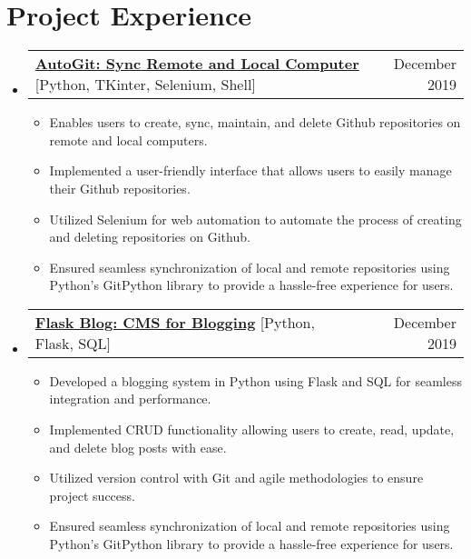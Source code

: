\documentclass[letterpaper,11pt]{article}
\makeatletter
\newcommand{\resumeItem}[1]{
  \item\small{
    {#1 \vspace{-2pt}}
  }
}
\newcommand{\resumeSubheading}[4]{
  \vspace{-2pt}\item
    \begin{tabular*}{0.97\textwidth}[t]{l@{\extracolsep{\fill}}r}
      \textbf{#1} & #2 \\
      \textit{\small#3} & \textit{\small #4} \\
    \end{tabular*}\vspace{-7pt}
}
\newcommand{\resumeProjectHeading}[2]{
    \item
    \begin{tabular*}{0.97\textwidth}{l@{\extracolsep{\fill}}r}
      \small#1 & #2 \\
    \end{tabular*}\vspace{-7pt}
}
\newcommand{\resumeSubHeadingListStart}{\begin{itemize}[leftmargin=0.15in, label={}]}
\newcommand{\resumeSubHeadingListEnd}{\end{itemize}}
\newcommand{\resumeItemListStart}{\begin{itemize}}
\newcommand{\resumeItemListEnd}{\end{itemize}\vspace{-5pt}}
\makeatother
\begin{document}
    
       




\section{Project Experience}

    \resumeSubHeadingListStart
      \resumeProjectHeading
          {\textbf{\href{https://github.com/divshekhar/AutoGit}{AutoGit: Sync Remote and Local Computer}}{ [Python, TKinter, Selenium, Shell]}}{December 2019}
          \resumeItemListStart
           \resumeItem{Enables users to create, sync, maintain, and delete Github repositories on remote and local computers.}
           \resumeItem{Implemented a user-friendly interface that allows users to easily manage their Github repositories.}
           \resumeItem{Utilized Selenium for web automation to automate the process of creating and deleting repositories on Github.}
           \resumeItem{Ensured seamless synchronization of local and remote repositories using Python's GitPython library to provide a hassle-free experience for users.}
          \resumeItemListEnd
    \resumeSubHeadingListEnd

    \resumeSubHeadingListStart
      \resumeProjectHeading
          {\textbf{\href{https://github.com/divshekhar/Flask-Blog}{Flask Blog: CMS for Blogging}}{ [Python, Flask, SQL]}}{December 2019}
          \resumeItemListStart
           \resumeItem{Developed a blogging system in Python using Flask and SQL for seamless integration and performance.}
           \resumeItem{Implemented CRUD functionality allowing users to create, read, update, and delete blog posts with ease.}
           \resumeItem{Utilized version control with Git and agile methodologies to ensure project success.}
           \resumeItem{Ensured seamless synchronization of local and remote repositories using Python's GitPython library to provide a hassle-free experience for users.}
          \resumeItemListEnd
    \resumeSubHeadingListEnd
\end{document}
